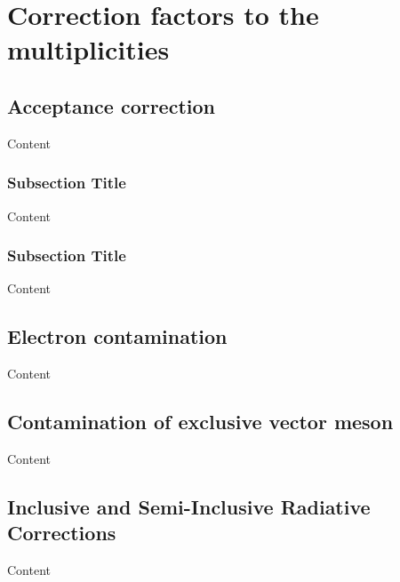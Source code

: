 
\chapter{Correction factors to the multiplicities} %

\label{ch:CF} %


\section{Acceptance correction}

Content


\subsection{Subsection Title}

Content


\subsection{Subsection Title}

Content


\section{Electron contamination}

Content


\section{Contamination of exclusive vector meson}

Content


\section{Inclusive and Semi-Inclusive Radiative Corrections}

Content
